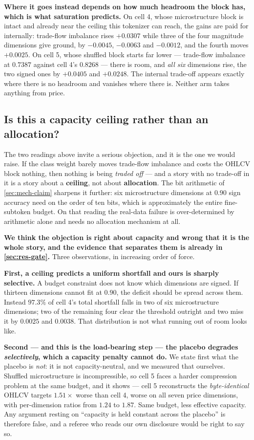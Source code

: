 \textbf{Where it goes instead depends on how much headroom the block has, which is what saturation
predicts.} On cell 4, whose microstructure block is intact and already near the ceiling this
tokenizer can reach, the gains are paid for internally: trade-flow imbalance rises $+0.0307$ while
three of the four magnitude dimensions give ground, by $-0.0045$, $-0.0063$ and $-0.0012$, and the
fourth moves $+0.0025$. On cell 5, whose shuffled block starts far lower --- trade-flow imbalance
at $0.7387$ against cell 4's $0.8268$ --- there is room, and \emph{all six} dimensions rise, the
two signed ones by $+0.0405$ and $+0.0248$. The internal trade-off appears exactly where there is
no headroom and vanishes where there is. Neither arm takes anything from price.

\subsection{Is this a capacity ceiling rather than an allocation?}
\label{sec:res-ceiling}

The two readings above invite a serious objection, and it is the one we would raise. If the class
weight barely moves trade-flow imbalance and costs the OHLCV block nothing, then nothing is
being \emph{traded off} --- and a story with no trade-off in it is a story about a \textbf{ceiling},
not about \textbf{allocation}. The bit arithmetic of \cref{sec:mech-claim} sharpens it further:
six microstructure dimensions at $0.90$ sign accuracy need on the order of ten bits, which is
approximately the entire fine-subtoken budget. On that reading the real-data failure is
over-determined by arithmetic alone and needs no allocation mechanism at all.

\textbf{We think the objection is right about capacity and wrong that it is the whole story, and
the evidence that separates them is already in \cref{sec:res-gate}.} Three observations, in
increasing order of force.

\textbf{First, a ceiling predicts a uniform shortfall and ours is sharply selective.} A budget
constraint does not know which dimensions are signed. If thirteen dimensions cannot fit at $0.90$,
the deficit should be spread across them. Instead $97.3\%$ of cell 4's total shortfall falls in two
of six microstructure dimensions; two of the remaining four clear the threshold outright and two
miss it by $0.0025$ and $0.0038$. That distribution is not what running out of room looks like.

\textbf{Second --- and this is the load-bearing step --- the placebo degrades \emph{selectively},
which a capacity penalty cannot do.} We state first what the placebo is \emph{not}: it is not
capacity-neutral, and we measured that ourselves. Shuffled microstructure is incompressible, so
cell 5 faces a harder compression problem at the same budget, and it shows --- cell 5 reconstructs
the \emph{byte-identical} OHLCV targets $1.51\times$ worse than cell 4, worse on all seven price
dimensions, with per-dimension ratios from $1.24$ to $1.87$. Same budget, less effective capacity.
Any argument resting on ``capacity is held constant across the placebo'' is therefore false, and a
referee who reads our own disclosure would be right to say so.

